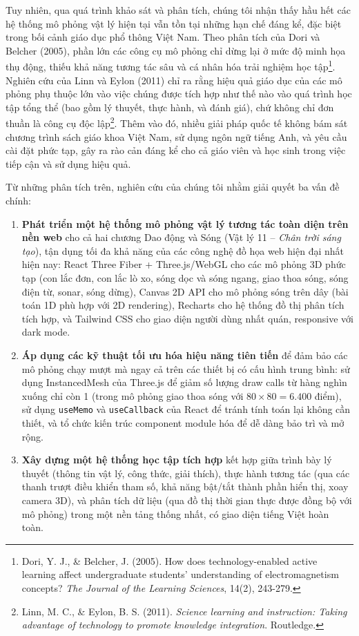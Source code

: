 Tuy nhiên, qua quá trình khảo sát và phân tích, chúng tôi nhận thấy hầu hết các hệ thống mô phỏng vật lý hiện tại vẫn tồn tại những hạn chế đáng kể, đặc biệt trong bối cảnh giáo dục phổ thông Việt Nam. Theo phân tích của Dori và Belcher (2005), phần lớn các công cụ mô phỏng chỉ dừng lại ở mức độ minh họa thụ động, thiếu khả năng tương tác sâu và cá nhân hóa trải nghiệm học tập\footnote{Dori, Y. J., \& Belcher, J. (2005). How does technology-enabled active learning affect undergraduate students' understanding of electromagnetism concepts? \textit{The Journal of the Learning Sciences}, 14(2), 243-279.}. Nghiên cứu của Linn và Eylon (2011) chỉ ra rằng hiệu quả giáo dục của các mô phỏng phụ thuộc lớn vào việc chúng được tích hợp như thế nào vào quá trình học tập tổng thể (bao gồm lý thuyết, thực hành, và đánh giá), chứ không chỉ đơn thuần là công cụ độc lập\footnote{Linn, M. C., \& Eylon, B. S. (2011). \textit{Science learning and instruction: Taking advantage of technology to promote knowledge integration}. Routledge.}. Thêm vào đó, nhiều giải pháp quốc tế không bám sát chương trình sách giáo khoa Việt Nam, sử dụng ngôn ngữ tiếng Anh, và yêu cầu cài đặt phức tạp, gây ra rào cản đáng kể cho cả giáo viên và học sinh trong việc tiếp cận và sử dụng hiệu quả.

Từ những phân tích trên, nghiên cứu của chúng tôi nhằm giải quyết ba vấn đề chính:

\begin{enumerate}
    \item \textbf{Phát triển một hệ thống mô phỏng vật lý tương tác toàn diện trên nền web} cho cả hai chương Dao động và Sóng (Vật lý 11 – \textit{Chân trời sáng tạo}), tận dụng tối đa khả năng của các công nghệ đồ họa web hiện đại nhất hiện nay: React Three Fiber + Three.js/WebGL cho các mô phỏng 3D phức tạp (con lắc đơn, con lắc lò xo, sóng dọc và sóng ngang, giao thoa sóng, sóng điện từ, sonar, sóng dừng), Canvas 2D API cho mô phỏng sóng trên dây (bài toán 1D phù hợp với 2D rendering), Recharts cho hệ thống đồ thị phân tích tích hợp, và Tailwind CSS cho giao diện người dùng nhất quán, responsive với dark mode.

    \item \textbf{Áp dụng các kỹ thuật tối ưu hóa hiệu năng tiên tiến} để đảm bảo các mô phỏng chạy mượt mà ngay cả trên các thiết bị có cấu hình trung bình: sử dụng InstancedMesh của Three.js để giảm số lượng draw calls từ hàng nghìn xuống chỉ còn 1 (trong mô phỏng giao thoa sóng với $80 \times 80 = 6.400$ điểm), sử dụng \texttt{useMemo} và \texttt{useCallback} của React để tránh tính toán lại không cần thiết, và tổ chức kiến trúc component module hóa để dễ dàng bảo trì và mở rộng.

    \item \textbf{Xây dựng một hệ thống học tập tích hợp} kết hợp giữa trình bày lý thuyết (thông tin vật lý, công thức, giải thích), thực hành tương tác (qua các thanh trượt điều khiển tham số, khả năng bật/tắt thành phần hiển thị, xoay camera 3D), và phân tích dữ liệu (qua đồ thị thời gian thực được đồng bộ với mô phỏng) trong một nền tảng thống nhất, có giao diện tiếng Việt hoàn toàn.
\end{enumerate}

